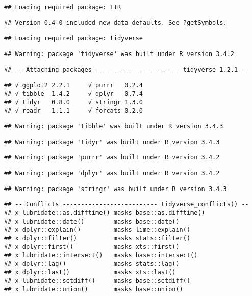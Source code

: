 \documentclass[]{article}
\begin{document}
\begin{verbatim}
## Loading required package: TTR
\end{verbatim}

\begin{verbatim}
## Version 0.4-0 included new data defaults. See ?getSymbols.
\end{verbatim}

\begin{verbatim}
## Loading required package: tidyverse
\end{verbatim}

\begin{verbatim}
## Warning: package 'tidyverse' was built under R version 3.4.2
\end{verbatim}

\begin{verbatim}
## -- Attaching packages ----------------------- tidyverse 1.2.1 --
\end{verbatim}

\begin{verbatim}
## √ ggplot2 2.2.1     √ purrr   0.2.4
## √ tibble  1.4.2     √ dplyr   0.7.4
## √ tidyr   0.8.0     √ stringr 1.3.0
## √ readr   1.1.1     √ forcats 0.2.0
\end{verbatim}

\begin{verbatim}
## Warning: package 'tibble' was built under R version 3.4.3
\end{verbatim}

\begin{verbatim}
## Warning: package 'tidyr' was built under R version 3.4.3
\end{verbatim}

\begin{verbatim}
## Warning: package 'purrr' was built under R version 3.4.2
\end{verbatim}

\begin{verbatim}
## Warning: package 'dplyr' was built under R version 3.4.2
\end{verbatim}

\begin{verbatim}
## Warning: package 'stringr' was built under R version 3.4.3
\end{verbatim}

\begin{verbatim}
## -- Conflicts -------------------------- tidyverse_conflicts() --
## x lubridate::as.difftime() masks base::as.difftime()
## x lubridate::date()        masks base::date()
## x dplyr::explain()         masks lime::explain()
## x dplyr::filter()          masks stats::filter()
## x dplyr::first()           masks xts::first()
## x lubridate::intersect()   masks base::intersect()
## x dplyr::lag()             masks stats::lag()
## x dplyr::last()            masks xts::last()
## x lubridate::setdiff()     masks base::setdiff()
## x lubridate::union()       masks base::union()
\end{verbatim}
\end{document}
